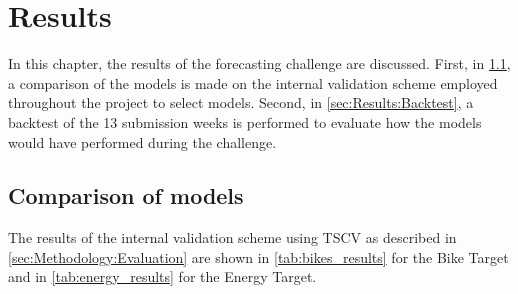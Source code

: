 \newpage
\section{Results}
\label{ch:Results}

In this chapter, the results of the forecasting challenge are discussed. First, in \cref{sec:Results:ComparisonModels}, a comparison of the models is made on the internal validation scheme employed throughout the project to select models. Second, in \cref{sec:Results:Backtest}, a backtest of the 13 submission weeks is performed to evaluate how the models would have performed during the challenge. 

\subsection{Comparison of models}
\label{sec:Results:ComparisonModels}

The results of the internal validation scheme using TSCV as described in \cref{sec:Methodology:Evaluation} are shown in \cref{tab:bikes_results} for the Bike Target and in \cref{tab:energy_results} for the Energy Target. 

\begin{table}[htp]
\centering
{}
\caption{Results of Timeseries Cross-Validation on the Bike Target for the full year 2024 with weekly shifting of sliding windows. Best values are highlighted in bold. \textit{Pinball Loss} refers to the sum of the pinball losses for all quantile levels, averaged over the folds in the TSCV (cf. \cref{sec:Methodology:Evaluation})}
\label{tab:bikes_results}
\end{table}

